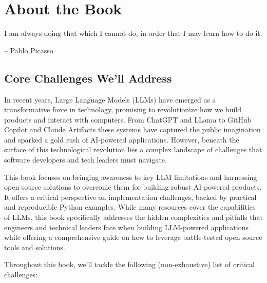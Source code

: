 \chapter{About the Book}

\begin{epigraph}
I am always doing that which I cannot do, in order that I may learn how to do it.

-- Pablo Picasso
\end{epigraph}

\tableofcontents

\section{Core Challenges We'll Address}

In recent years, Large Language Models (LLMs) have emerged as a transformative force in technology, promising to revolutionize how we build products and interact with computers. From ChatGPT and LLama to GitHub Copilot and Claude Artifacts these systems have captured the public imagination and sparked a gold rush of AI-powered applications. However, beneath the surface of this technological revolution lies a complex landscape of challenges that software developers and tech leaders must navigate.

This book focuses on bringing awareness to key LLM limitations and harnessing open source solutions to overcome them for building robust AI-powered products. It offers a critical perspective on implementation challenges, backed by practical and reproducible Python examples. While many resources cover the capabilities of LLMs, this book specifically addresses the hidden complexities and pitfalls that engineers and technical leaders face when building LLM-powered applications while offering a comprehensive guide on how to leverage battle-tested open source tools and solutions.

Throughout this book, we'll tackle the following (non-exhaustive) list of critical challenges:

